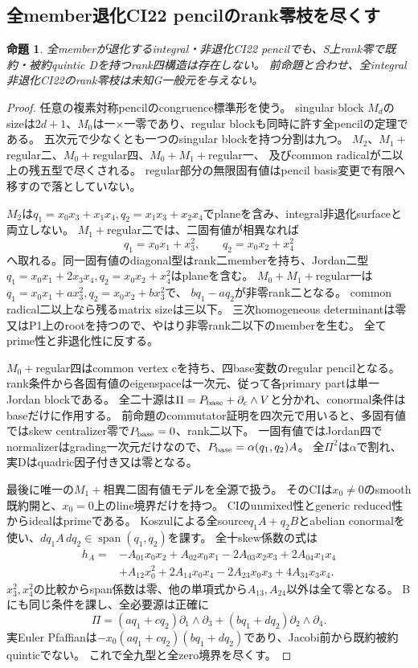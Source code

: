 \documentclass[a4paper,11pt]{ltjsarticle}
\newtheorem{proposition}{命題}[section]
\theoremstyle{definition}
\begin{document}
\subsection{全member退化CI22 pencilのrank零枝を尽くす}
\begin{proposition}\label{prop:degenerate-CI22-rank-zero}
全memberが退化するintegral・非退化CI22 pencilでも、S上rank零で既約・被約quintic Dを持つrank四構造は存在しない。
前命題と合わせ、全integral非退化CI22のrank零枝は未知G一般元を与えない。
\end{proposition}
\begin{proof}
任意の複素対称pencilのcongruence標準形\cite[\S2, Theorem 2.1]{symmetricpencils}を使う。
singular block $M_d$のsizeは$2d+1$、$M_0$は一×一零であり、regular blockも同時に許す全pencilの定理である。
五次元で少なくとも一つのsingular blockを持つ分割は九つ。
$M_2$、$M_1+$regular二、$M_0+$regular四、$M_0+M_1+$regular一、
及びcommon radicalが二以上の残五型で尽くされる。
regular部分の無限固有値はpencil basis変更で有限へ移すので落としていない。

$M_2$は$q_1=x_0x_3+x_1x_4,q_2=x_1x_3+x_2x_4$でplaneを含み、integral非退化surfaceと両立しない。
$M_1+$regular二では、二固有値が相異なれば
\[
 q_1=x_0x_1+x_3^2,\qquad q_2=x_0x_2+x_4^2
\]
へ取れる。同一固有値のdiagonal型はrank二memberを持ち、Jordan二型
$q_1=x_0x_1+2x_3x_4,q_2=x_0x_2+x_4^2$はplaneを含む。
$M_0+M_1+$regular一は$q_1=x_0x_1+ax_3^2,q_2=x_0x_2+bx_3^2$で、
$bq_1-aq_2$が非零rank二となる。
common radical二以上なら残るmatrix sizeは三以下。
三次homogeneous determinantは零又はP1上のrootを持つので、やはり非零rank二以下のmemberを生む。
全てprime性と非退化性に反する。

$M_0+$regular四はcommon vertex cを持ち、四base変数のregular pencilとなる。
rank条件から各固有値のeigenspaceは一次元、従って各primary partは単一Jordan blockである。
全二十源は$\Pi=P_{\rm base}+\partial_c\wedge V$と分かれ、conormal条件はbaseだけに作用する。
前命題のcommutator証明を四次元で用いると、多固有値ではskew centralizer零で$P_{\rm base}=0$、rank二以下。
一固有値ではJordan四でnormalizerはgrading一次元だけなので、$P_{\rm base}=\alpha(q_1,q_2)A$。
全$\Pi^2$は$\alpha$で割れ、実Dはquadric因子付き又は零となる。

最後に唯一の$M_1+$相異二固有値モデルを全源で扱う。
そのCIは$x_0\ne0$のsmooth既約開と、$x_0=0$上のline境界だけを持つ。
CIのunmixed性とgeneric reduced性からidealはprimeである。
Koszulによる全source$q_1A+q_2B$とabelian conormalを使い、$dq_1A\,dq_2\in\operatorname{span}(q_1,q_2)$を課す。
全十skew係数の式は
\[
\begin{aligned}
 h_A={}&-A_{01}x_0x_2+A_{02}x_0x_1-2A_{03}x_2x_3+2A_{04}x_1x_4\\
 &+A_{12}x_0^2+2A_{14}x_0x_4-2A_{23}x_0x_3+4A_{34}x_3x_4.
\end{aligned}
\]
$x_3^2,x_4^2$の比較からspan係数は零、他の単項式から$A_{13},A_{24}$以外は全て零となる。
Bにも同じ条件を課し、全必要源は正確に
\[
 \Pi=(aq_1+cq_2)\partial_1\wedge\partial_3+(bq_1+dq_2)\partial_2\wedge\partial_4.
\]
実Euler Pfaffianは$-x_0(aq_1+cq_2)(bq_1+dq_2)$であり、Jacobi前から既約被約quinticでない。
これで全九型と全zero境界を尽くす。
\end{proof}
\end{document}
